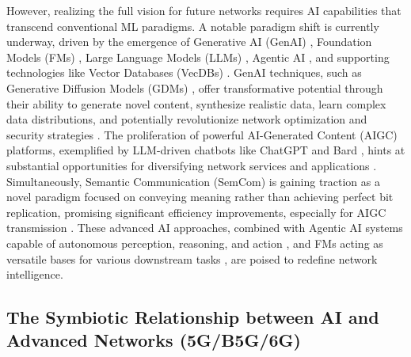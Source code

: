 \documentclass[sigconf]{acmart}
\begin{document}
However, realizing the full vision for future networks requires AI capabilities that transcend conventional ML paradigms. A notable paradigm shift is currently underway, driven by the emergence of Generative AI (GenAI) \cite{ref2, ref9, ref19, ref20, ref26, ref31, ref33}, Foundation Models (FMs) \cite{ref16, ref17}, Large Language Models (LLMs) \cite{ref2, ref4, ref8, ref14, ref17, ref18, ref21, ref25}, Agentic AI \cite{ref35}, and supporting technologies like Vector Databases (VecDBs) \cite{ref8, ref14}. GenAI techniques, such as Generative Diffusion Models (GDMs) \cite{ref19, ref33}, offer transformative potential through their ability to generate novel content, synthesize realistic data, learn complex data distributions, and potentially revolutionize network optimization and security strategies \cite{ref5, ref9, ref19, ref20, ref26}. The proliferation of powerful AI-Generated Content (AIGC) platforms, exemplified by LLM-driven chatbots like ChatGPT and Bard \cite{ref2, ref26}, hints at substantial opportunities for diversifying network services and applications \cite{ref15, ref26, ref31}. Simultaneously, Semantic Communication (SemCom) is gaining traction as a novel paradigm focused on conveying meaning rather than achieving perfect bit replication, promising significant efficiency improvements, especially for AIGC transmission \cite{ref22, ref23}. These advanced AI approaches, combined with Agentic AI systems capable of autonomous perception, reasoning, and action \cite{ref35}, and FMs acting as versatile bases for various downstream tasks \cite{ref16, ref17}, are poised to redefine network intelligence.

\subsection{The Symbiotic Relationship between AI and Advanced Networks (5G/B5G/6G)}
\label{sec:intro_symbiosis}
\end{document}
